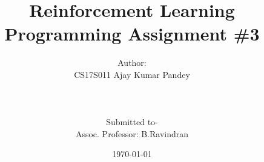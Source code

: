 \documentclass[a4paper]{article}
\begin{document}
\title{Reinforcement Learning \\Programming Assignment \#3}
\author{Author:\\CS17S011 Ajay Kumar Pandey
\\ \\ \\ \\ Submitted to- \\Assoc. Professor: B.Ravindran }

\date{\today}
\maketitle
\newpage
\setlength{\parskip}{2ex}
\maketitle
\end{document}
